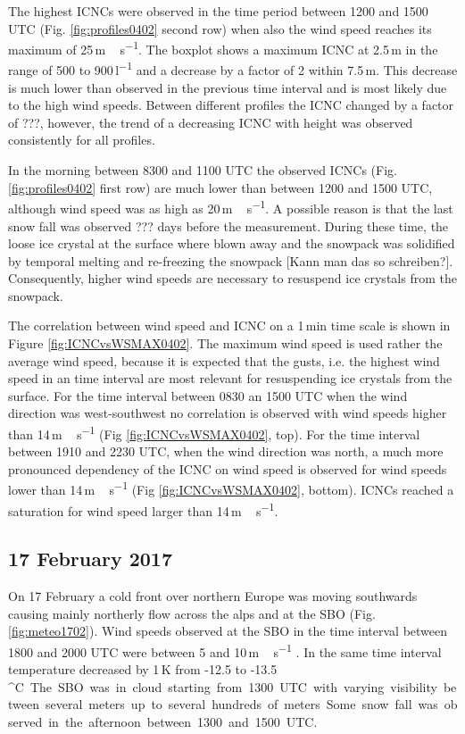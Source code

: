 \documentclass[draft,linenumbers]{agujournal}
\begin{document}
The highest ICNCs were observed in the time period between 1200 and 1500 UTC (Fig. \ref{fig:profiles0402} second row) when also the wind speed reaches its maximum of 25\,\si{m\,s^{-1}}. The boxplot shows a maximum ICNC at 2.5\,\si{m} in the range of 500 to 900\,\si{l^{-1}} and a decrease by a factor of 2 within 7.5\,\si{m}. This decrease is much lower than observed in the previous time interval and is most likely due to the high wind speeds. Between different profiles the ICNC changed by a factor of ???, however, the trend of a decreasing ICNC with height was observed consistently for all profiles.

In the morning between 8300 and 1100 UTC the observed ICNCs (Fig. \ref{fig:profiles0402} first row) are much lower than between 1200 and 1500 UTC, although wind speed was as high as 20\,\si{m\,s^{-1}}. A possible reason is that the last snow fall was observed ??? days before the measurement. During these time, the loose ice crystal at the surface where blown away and the snowpack was solidified by temporal melting and re-freezing the snowpack [Kann man das so schreiben?]. Consequently, higher wind speeds are necessary to resuspend ice crystals from the snowpack. 

The correlation between wind speed and ICNC on a 1\,\si{min} time scale is shown in Figure \ref{fig:ICNCvsWSMAX0402}. The maximum wind speed is used rather the average wind speed, because it is expected that the gusts, i.e. the highest wind speed in an time interval are most relevant for resuspending ice crystals from the surface. For the time interval between 0830 an 1500 UTC when the wind direction was west-southwest no correlation is observed with wind speeds higher than 14\,\si{m\,s^{-1}} (Fig \ref{fig:ICNCvsWSMAX0402}, top). For the time interval between 1910 and 2230 UTC, when the wind direction was north, a much more pronounced dependency of the ICNC on wind speed is observed for wind speeds lower than 14\,\si{m\,s^{-1}} (Fig \ref{fig:ICNCvsWSMAX0402}, bottom). ICNCs reached a saturation for wind speed larger than 14\,\si{m\,s^{-1}}.

\subsection{17 February 2017}
On 17 February a cold front over northern Europe was moving southwards causing mainly northerly flow across the alps and at the SBO (Fig. \ref{fig:meteo1702}). Wind speeds observed at the SBO in the time interval between 1800 and 2000 UTC were between 5 and 10\,\si{m\,s^{-1}} .  In the same time interval temperature decreased by 1\,\si{K} from -12.5 to -13.5\,\si{^\circ C}. The SBO was in cloud starting from 1300 UTC with varying visibility between several meters up to several hundreds of meters. Some snow fall was observed in the afternoon between 1300 and 1500 UTC. 
\end{document}
